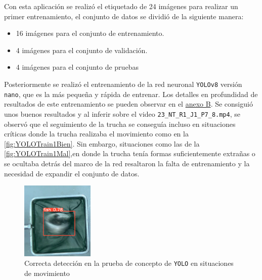 Con esta aplicación se realizó el etiquetado de 24 imágenes para realizar un primer entrenamiento, el conjunto de datos se dividió de la siguiente manera:
\begin{itemize}
    \item 16 imágenes para el conjunto de entrenamiento.
    \item 4 imágenes para el conjunto de validación.
    \item 4 imágenes para el conjunto de pruebas
\end{itemize}

Posteriormente se realizó el entrenamiento de la red neuronal \texttt{YOLOv8} versión \texttt{nano}, que es la más pequeña y rápida de entrenar. Los detalles en profundidad de resultados de este 
entrenamiento se pueden observar en el \hyperref[train:1]{anexo B}. \newline
Se consiguió unos buenos resultados y al inferir sobre el video \verb|23_NT_R1_J1_P7_8.mp4|, se observó que el seguimiento de la trucha se conseguía incluso en situaciones críticas donde la trucha realizaba 
el movimiento como en la \autoref{fig:YOLOTrain1Bien}. Sin embargo, situaciones como las de la \autoref{fig:YOLOTrain1Mal},en donde la trucha tenía formas suficientemente extrañas o se ocultaba detrás del marco de la red resaltaron la falta de entrenamiento y la 
necesidad de expandir el conjunto de datos.
\begin{figure}[H]
    \centering
    \includegraphics[width=0.31\textwidth]{images/6/6.2.2/DeteccionTrain1.png}
    \caption{Correcta detección en la prueba de concepto de \texttt{YOLO} en situaciones de movimiento}
    \label{fig:YOLOTrain1Bien}
\end{figure}


